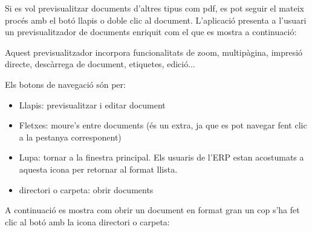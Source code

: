 \documentclass[letterpaper,11pt,catalan]{sphinxmanual}
\begin{document}
Si es vol previsualitzar documents d'altres tipus com pdf, es pot seguir el mateix
procés amb el botó llapis o doble clic al document.
L'aplicació presenta a l'usuari un previsualitzador de documents enriquit com el
que es mostra a continuació:


Aquest previsualitzador incorpora funcionalitats de zoom, multipàgina, impresió directe,
descàrrega de document, etiquetes, edició...


\begin{DUlineblock}{0em}
\item[] 
\item[] 
\item[] 
\end{DUlineblock}

Els botons de navegació són per:
\begin{itemize}
\item {} 
Llapis: previsualitzar i editar document

\item {} 
Fletxes: moure's entre documents (és un extra, ja que es pot navegar fent clic a la pestanya corresponent)

\item {} 
Lupa: tornar a la finestra principal. Els usuaris de l'ERP estan acostumats a aquesta icona per retornar al format llista.

\item {} 
directori o carpeta: obrir documents

\end{itemize}

A continuació es mostra com obrir un document en format gran un cop s'ha fet clic al botó amb
la icona directori o carpeta:


\begin{DUlineblock}{0em}
\item[] 
\end{DUlineblock}
\end{document}
